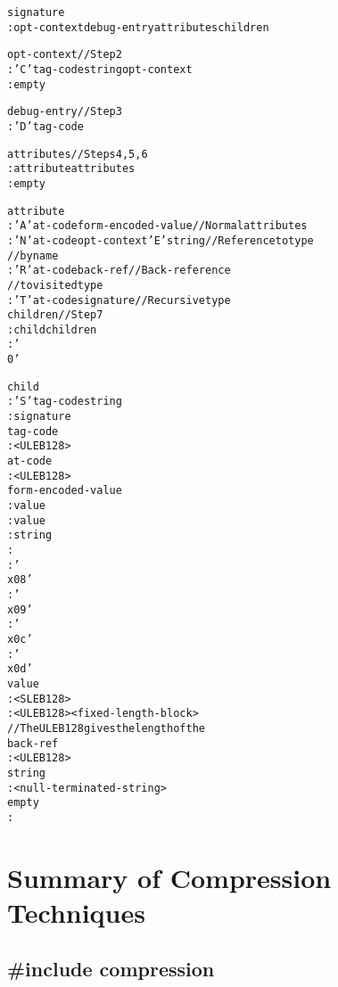 \begin{alltt}
signature
    : opt-context debug-entry attributes children

opt-context           // Step 2
    : 'C' tag-code string opt-context
    : empty

debug-entry           // Step 3
    : 'D' tag-code

attributes            // Steps 4, 5, 6
    : attribute attributes
    : empty

attribute
    : 'A' at-code form-encoded-value     // Normal attributes
    : 'N' at-code opt-context 'E' string // Reference to type
                                         // by name
    : 'R' at-code back-ref               // Back-reference 
                                         // to visited type
    : 'T' at-code signature              // Recursive type
children             //  Step 7
    : child children
    : '\\0'

child
    : 'S' tag-code string
    : signature
tag-code
    : <ULEB128>
at-code
    : <ULEB128>
form-encoded-value
    :  value
    :  value
    :  string
    :  
    : '\\x08'
    : '\\x09'
    : '\\x0c'
    : '\\x0d'
value
    : <SLEB128>
    : <ULEB128> <fixed-length-block>
                      // The ULEB128 gives the length of the 
back-ref
    : <ULEB128>
string
    : <null-terminated-string>
empty
    :
\end{alltt}


\section{Summary of Compression Techniques}
\label{app:summaryofcompressiontechniques}
\subsection{\#include compression}
\label{app:includecompression}

